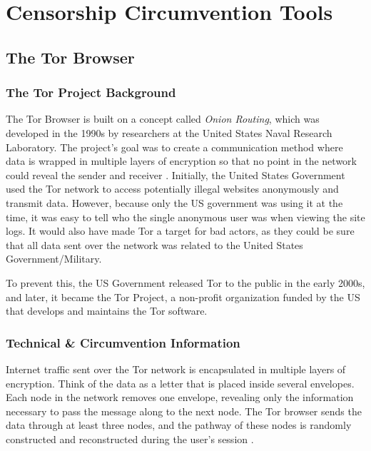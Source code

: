 \section{Censorship Circumvention Tools}

\subsection{The Tor Browser}

\subsubsection{The Tor Project Background}

The Tor Browser is built on a concept called \textit{Onion Routing}, which was developed in the 1990s by researchers at the United States Naval Research Laboratory. The project's goal was to create a communication method where data is wrapped in multiple layers of encryption so that no point in the network could reveal the sender and receiver \cite{torprojectProjectPrivacy}. Initially, the United States Government used the Tor network to access potentially illegal websites anonymously and transmit data. However, because only the US government was using it at the time, it was easy to tell who the single anonymous user was when viewing the site logs. It would also have made Tor a target for bad actors, as they could be sure that all data sent over the network was related to the United States Government/Military.

To prevent this, the US Government released Tor to the public in the early 2000s, and later, it became the Tor Project, a non-profit organization funded by the US that develops and maintains the Tor software. 

\subsubsection{Technical \& Circumvention Information}

Internet traffic sent over the Tor network is encapsulated in multiple layers of encryption. Think of the data as a letter that is placed inside several envelopes. Each node in the network removes one envelope, revealing only the information necessary to pass the message along to the next node. The Tor browser sends the data through at least three nodes, and the pathway of these nodes is randomly constructed and reconstructed during the user's session \cite{dingledine2004tor}.

